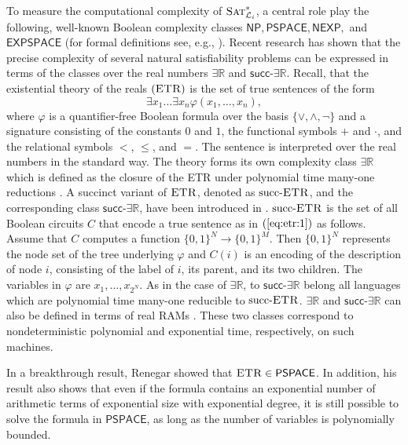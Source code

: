 \documentclass[a4paper,UKenglish,cleveref, autoref, thm-restate]{lipics-v2021}
\newcommand{\IR}{\mathbb{R}}
\newcommand{\existsR}{\ensuremath{\mathsf{\exists\IR}}}
\newcommand{\ETR}{\ensuremath{\textsc{ETR}}}
\newcommand{\succETR}{\ensuremath{\textup{succ}\text{-}\textsc{ETR}}}
\newcommand{\succR}{\ensuremath{\mathsf{succ\text{-}\exists\IR}}}
\newcommand{\NP}{\ensuremath{\mathsf{NP}}}
\newcommand{\NEXP}{\ensuremath{\mathsf{NEXP}}}
\newcommand{\PSPACE}{\ensuremath{\mathsf{PSPACE}}}
\newcommand{\EXPSPACE}{\ensuremath{\mathsf{EXPSPACE}}}
\newcommand{\cL}{{\mathcal L}}
\newcommand{\SATistar}{\mbox{\sc Sat}^{*}_{\cL_i}}
\begin{document}
To measure the computational complexity of $\SATistar$, a central role play the
following, well-known Boolean complexity classes $\NP, \PSPACE, \NEXP,$ and $\EXPSPACE$   
(for formal definitions see, e.g., \cite{arora2009computational}).
Recent research has shown that the precise complexity of several natural 
satisfiability problems can be expressed in terms of the classes over the real numbers 
$\existsR$ and $\succR$.  Recall, that the existential theory of the reals $(\ETR)$ is the set of true sentences
of the form
\begin{equation} \label{eq:etr:1}
   \exists x_1 \dots \exists x_n \varphi(x_1,\dots,x_n),
\end{equation}
where $\varphi$ is a quantifier-free Boolean formula over the basis $\{\vee, \wedge, \neg\}$
and a signature consisting of the constants $0$ and $1$, the functional symbols
$+$ and $\cdot$, and the relational symbols $<$, $\le$, and $=$. The sentence
is interpreted over the real numbers in the standard way.
The theory forms its own complexity class $\exists \mathbb{R}$ which is 
defined as the closure of the ETR under polynomial time many-one reductions
\citep{grigoriev1988solving,existentialTheoryOfRealsCanny1988some,existentialTheoryOfRealsSchaefer2009complexity}.
A succinct variant of $\ETR$, denoted as  $\succETR$, and the corresponding 
class $\succR$, have been introduced in \cite{zander2023ijcai}.
$\succETR$ is the set of all Boolean circuits $C$ that encode 
a true sentence as in $(\ref{eq:etr:1})$ as follows. Assume that 
$C$ computes a function $\{0,1\}^N \to \{0,1\}^M$. Then $\{0,1\}^N$ 
represents the node 
set of the tree underlying $\varphi$
and $C(i)$ is an encoding of the description of node $i$, consisting of the label
of $i$, its parent, and its two children. The variables in 
$\varphi$ are $x_1,\dots,x_{2^N}$. As in the case of $\existsR$, to 
$\succR$ belong all languages 
which are polynomial time many-one reducible to $\succETR$. $\existsR$ and $\succR$ can also be defined in terms of real RAMs \cite{erickson2022smoothing, blaser2024existential}. These two classes correspond to nondeterministic polynomial and exponential time, respectively, on  such machines.

In a breakthrough result, Renegar \cite{renegar1992computational} showed that $\ETR \in \PSPACE$.
In addition, his result also shows that even if the formula contains an exponential number of arithmetic terms of exponential size with exponential degree, it is still possible to solve the formula in $\PSPACE$, as long as the number of variables is polynomially bounded.
\end{document}
